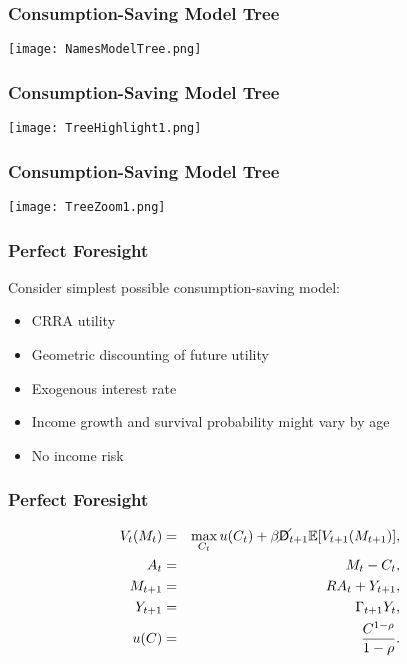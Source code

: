 \documentclass[11pt]{cfpbpresentation}
\newcommand{\E}{\mathbb{E}}
\newcommand{\Die}{\mathsf{D}}
\newcommand{\Live}{\cancel{\Die}}
\begin{document}
\begin{frame}
\frametitle{Consumption-Saving Model Tree}
\begin{center}
\texttt{[image: NamesModelTree.png]}
\end{center}
\end{frame}

\begin{frame}
\frametitle{Consumption-Saving Model Tree}
\begin{center}
\texttt{[image: TreeHighlight1.png]}
\end{center}
\end{frame}

\begin{frame}
\frametitle{Consumption-Saving Model Tree}
\begin{center}
\texttt{[image: TreeZoom1.png]}
\end{center}
\end{frame}


\begin{frame}
\frametitle{Perfect Foresight}
Consider simplest possible consumption-saving model:
\begin{itemize}
\item CRRA utility

\item Geometric discounting of future utility

\item Exogenous interest rate

\item Income growth and survival probability might vary by age

\item No income risk
\end{itemize}
\end{frame}

\begin{frame}
\frametitle{Perfect Foresight}
\begin{eqnarray*}
V_t(M_t) &=& \max_{C_t} u(C_t) + \beta \Live_{t+1} \E [V_{t+1}(M_{t+1}) ], \\
A_t &=& M_t - C_t, \\
M_{t+1} &=& R A_t + Y_{t+1}, \\
Y_{t+1} &=& \Gamma_{t+1} Y_t, \\
u(C) &=& \frac{C^{1-\rho}}{1-\rho}.
\end{eqnarray*}
\end{frame}
\end{document}
